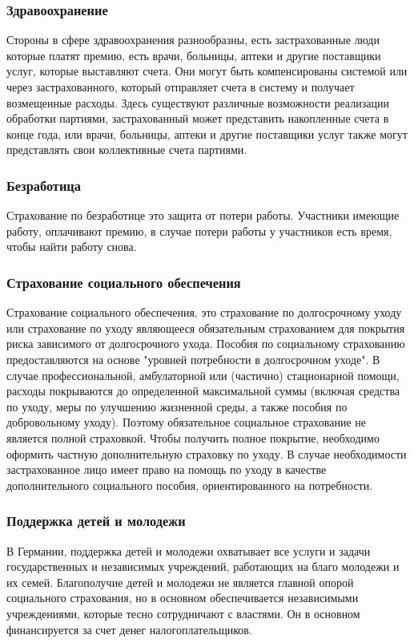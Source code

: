 \subsubsection*{Здравоохранение}
Стороны в сфере здравоохранения разнообразны, есть застрахованные люди которые платят премию, есть врачи, больницы, аптеки и другие поставщики услуг, которые выставляют счета. Они могут быть компенсированы системой или через застрахованного, который отправляет счета в систему и получает возмещенные расходы. Здесь существуют различные возможности реализации обработки партиями, застрахованный может представить накопленные счета в конце года, или врачи, больницы, аптеки и другие поставщики услуг также могут представлять свои коллективные счета партиями.

\subsubsection*{Безработица}
Страхование по безработице это защита от потери работы. Участники имеющие работу, оплачивают премию, в случае потери работы у участников есть время, чтобы найти работу снова.

\subsubsection*{Страхование социального обеспечения}

Страхование социального обеспечения, это страхование по долгосрочному уходу или страхование по уходу являющееся обязательным страхованием для покрытия риска зависимого от долгосрочного ухода. Пособия по социальному страхованию предоставляются на основе "уровней потребности в долгосрочном уходе". В случае профессиональной, амбулаторной или (частично) стационарной помощи, расходы покрываются до определенной максимальной суммы (включая средства по уходу, меры по улучшению жизненной среды, а также пособия по добровольному уходу). Поэтому обязательное социальное страхование не является полной страховкой. Чтобы получить полное покрытие, необходимо оформить частную дополнительную страховку по уходу. В случае необходимости застрахованное лицо имеет право на помощь по уходу в качестве дополнительного социального пособия, ориентированного на потребности.

\subsubsection*{Поддержка детей и молодежи}
В Германии, поддержка детей и молодежи охватывает все услуги и задачи государственных и независимых учреждений, работающих на благо молодежи и их семей. Благополучие детей и молодежи не является главной опорой социального страхования, но в основном обеспечивается независимыми учреждениями, которые тесно сотрудничают с властями. Он в основном финансируется за счет денег налогоплательщиков. 

